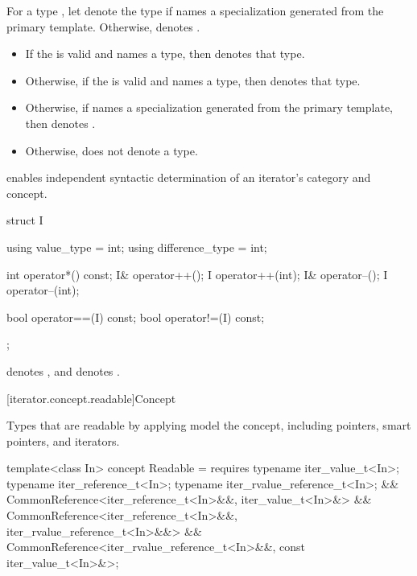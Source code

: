 \pnum
For a type , let  denote
the type  if  names
a specialization generated from the primary template.
Otherwise,  denotes
.
\begin{itemize}
\item If the 
   is valid
  and names a type, then  denotes that
  type.
\item Otherwise, if the 
  is valid and names a type, then 
  denotes that type.
\item Otherwise, if  names a specialization generated
  from the primary template, then 
  denotes .
\item Otherwise,  does not denote a type.
\end{itemize}

\pnum
\begin{note}
 enables independent syntactic determination
of an iterator's category and concept.
\end{note}
\begin{example}
\begin{codeblock}
struct I {
  using value_type = int;
  using difference_type = int;

  int operator*() const;
  I& operator++();
  I operator++(int);
  I& operator--();
  I operator--(int);

  bool operator==(I) const;
  bool operator!=(I) const;
};
\end{codeblock}
 denotes ,
and  denotes .
\end{example}

[iterator.concept.readable]{Concept }

\pnum
Types that are readable by applying 
model the  concept, including
pointers, smart pointers, and iterators.

%
\begin{codeblock}
template<class In>
  concept Readable =
    requires {
      typename iter_value_t<In>;
      typename iter_reference_t<In>;
      typename iter_rvalue_reference_t<In>;
    } &&
    CommonReference<iter_reference_t<In>&&, iter_value_t<In>&> &&
    CommonReference<iter_reference_t<In>&&, iter_rvalue_reference_t<In>&&> &&
    CommonReference<iter_rvalue_reference_t<In>&&, const iter_value_t<In>&>;
\end{codeblock}

